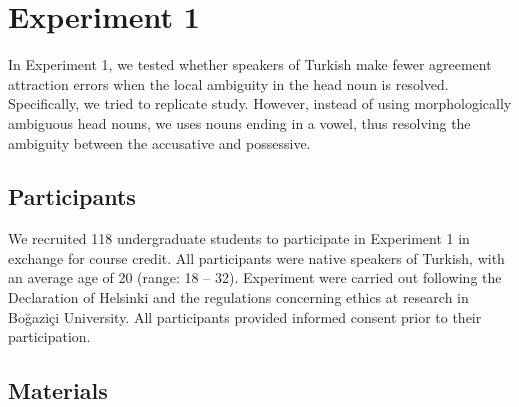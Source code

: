\documentclass[doc,a4paper,man,natbib,floatsintext,noextraspace]{apa6}\usepackage[]{graphicx}\usepackage[]{color}
\begin{document}


\section{Experiment 1} \label{sec:exp1}



In Experiment 1, we tested whether speakers of Turkish make fewer agreement attraction errors when the local ambiguity in the head noun is resolved. 
Specifically, we tried to replicate \citet{LagoEtAl:2018} study. However, instead of using morphologically ambiguous head nouns, we uses nouns ending in a vowel, thus resolving the ambiguity between the accusative and possessive. 

\subsection{Participants} \label{sec:exp1:participants}

We recruited 118 undergraduate students to participate in Experiment 1 in exchange for course credit. All participants were native speakers of Turkish, with an average age of 20 (range: 18 -- 32).  
Experiment were carried out following the Declaration of Helsinki and the regulations concerning ethics at research in Bo\u{g}azi\c{c}i University. All participants provided informed consent prior to their participation.

\subsection{Materials} \label{sec:exp1:materials}
\end{document}
